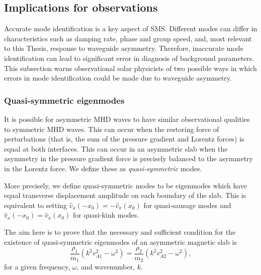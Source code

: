 \documentclass[12pt]{../style-files/ociamthesis}
\begin{document}
\subsection{Implications for observations}

Accurate mode identification is a key aspect of SMS. Different modes can differ in characteristics such as damping rate, phase and group speed, and, most relevant to this Thesis, response to waveguide asymmetry. Therefore, inaccurate mode identification can lead to significant error in diagnosis of background parameters. This subsection warns observational solar physicists of two possible ways in which errors in mode identification  could be made due to waveguide asymmetry.


\subsubsection{Quasi-symmetric eigenmodes}

It is possible for asymmetric MHD waves to have similar observational qualities to symmetric MHD waves. This can occur when the restoring force of perturbations (that is, the sum of the pressure gradient and Lorentz forces) is equal at both interfaces. This can occur in an asymmetric slab when the asymmetry in the pressure gradient force is precisely balanced to the asymmetry in the Lorentz force. We define these as \textit{quasi-symmetric} modes.

More precisely, we define quasi-symmetric modes to be eigenmodes which have equal transverse displacement amplitude on each boundary of the slab. This is equivalent to setting $\hat{v}_x (-x_0) = - \hat{v}_x (x_0)$ for quasi-sausage modes and $\hat{v}_x (-x_0) = \hat{v}_x (x_0)$ for quasi-kink modes.

The aim here is to prove that the necessary and sufficient condition for the existence of quasi-symmetric eigenmodes of an asymmetric magnetic slab is
\begin{equation}
\frac{\rho_1}{m_1}(k^2v_{A1}^2 - \omega^2) = \frac{\rho_2}{m_2}(k^2v_{A2}^2 - \omega^2), \label{quasi-sym condition}
\end{equation}
for a given frequency, $\omega$, and wavenumber, $k$.
\end{document}

